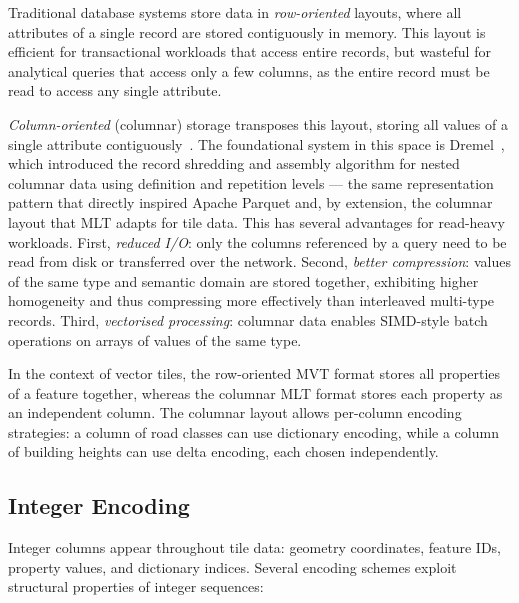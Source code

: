 Traditional database systems store data in \emph{row-oriented} layouts, where all attributes of a single record are stored contiguously in memory.
This layout is efficient for transactional workloads that access entire records, but wasteful for analytical queries that access only a few columns, as the entire record must be read to access any single attribute.

\emph{Column-oriented} (columnar) storage transposes this layout, storing all values of a single attribute contiguously~\cite{abadiDesignImplementationModern2013}.
The foundational system in this space is Dremel~\cite{melnikDremelInteractiveAnalysis2010}, which introduced the record shredding and assembly algorithm for nested columnar data using definition and repetition levels --- the same representation pattern that directly inspired Apache Parquet and, by extension, the columnar layout that \ac{MLT} adapts for tile data.
This has several advantages for read-heavy workloads.
First, \emph{reduced I/O}: only the columns referenced by a query need to be read from disk or transferred over the network.
Second, \emph{better compression}: values of the same type and semantic domain are stored together, exhibiting higher homogeneity and thus compressing more effectively than interleaved multi-type records.
Third, \emph{vectorised processing}: columnar data enables \ac{SIMD}-style batch operations on arrays of values of the same type.

In the context of vector tiles, the row-oriented \ac{MVT} format stores all properties of a feature together, whereas the columnar \ac{MLT} format stores each property as an independent column.
The columnar layout allows per-column encoding strategies: a column of road classes can use dictionary encoding, while a column of building heights can use delta encoding, each chosen independently.

\subsection{Integer Encoding}\label{sub_integer_encoding}

Integer columns appear throughout tile data: geometry coordinates, feature IDs, property values, and dictionary indices.
Several encoding schemes exploit structural properties of integer sequences:

